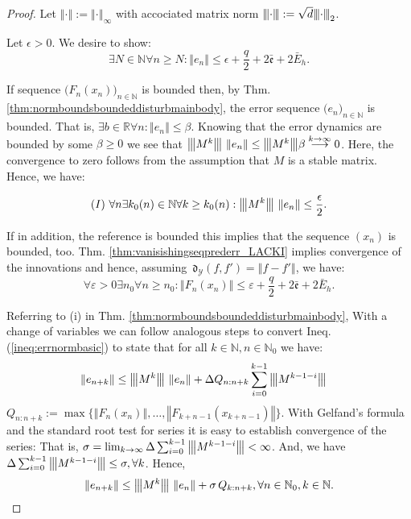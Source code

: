 \documentclass{article} %
\theoremstyle{definition}
\theoremstyle{remark}
\newcommand{\matnorm}[1]{{\left\vert\kern-0.25ex\left\vert\kern-0.25ex\left\vert #1 
    \right\vert\kern-0.25ex\right\vert\kern-0.25ex\right\vert}}
\newcommand{\specnorm}[1]{\matnorm{#1}_2}
\newcommand{\norm}[1]{\left\Vert#1\right\Vert}
\newcommand{\Real}{\mathbb R}
\newcommand{\nat}{\mathbb N}
\newcommand{\vc}[1]{#1}
\newcommand{\outspace}{\ensuremath{ \mathcal Y}}
\newcommand{\metric}{\, \mathfrak{d}} %
\newcommand{\obserrbnd}{\bar{\mathfrak e}}
\newcommand{\seq}[2]{\ensuremath{\bigl(#1\bigr)_{#2}}}
\newcommand{\tinc}{\ensuremath{ \Delta}}
\begin{document}
\begin{proof} Let $\norm{\cdot} := \norm{\cdot}_\infty$ with accociated matrix norm $\matnorm{\cdot} := \sqrt{d} \specnorm{\cdot}$. 


Let $\epsilon >0$. We desire to show: 
\begin{equation}\label{}
\exists N \in \nat \forall n\geq N: \norm{e_n} \leq \epsilon+\frac q 2 + 2  \obserrbnd  +2 \bar E_h.
\end{equation}

If sequence $\seq{F_n(x_n)}{n\in \nat} $ is bounded then, by Thm. \ref{thm:normboundsboundeddisturbmainbody}, the error sequence \seq{e_n}{n\in \nat} is bounded.  That is, $\exists b \in \Real \forall n: \norm{e_n} \leq \beta$.
Knowing that the error dynamics are bounded by some $\beta \geq 0$ we see that $\matnorm{M^{k}} \, \norm{\vc e_n} \leq \matnorm{M^{k}} \beta \stackrel{k \to \infty}{\longrightarrow} 0$. Here, the convergence to zero follows from the assumption that $M$ is a stable matrix. Hence,
we have:

$$(I)  \, \, \forall n \exists k_0(n) \in \nat \forall k \geq k_0(n): \matnorm{M^{k}} \, \norm{\vc e_n} \leq \frac\epsilon 2. $$


If in addition, the reference is bounded this implies that the sequence $(x_n)$ is bounded, too. Thm. \ref{thm:vanisishingseqprederr_LACKI} implies convergence of the innovations and hence, assuming $\metric_\outspace (f,f') = \norm{f-f'}$, we have:
\begin{equation}\label{eq:Fnconv}
\forall \varepsilon >0 \exists n_0 \forall n \geq n_0 : \norm{F_n(x_n)}\leq  \varepsilon +\frac q 2 + 2  \obserrbnd  +2 \bar E_h.
\end{equation} 


Referring to (i) in Thm. \ref{thm:normboundsboundeddisturbmainbody}, With a change of variables we can follow analogous steps to convert Ineq. (\ref{ineq:errnormbasic}) to state that for all $k \in \nat, n \in \nat_0$ we have: 
\begin{align}
	\norm{\vc e_{n+k}} 	&\leq \matnorm{M^{k}} \, \norm{\vc e_n} + \tinc Q_{n:n+k}	 \sum_{i=0}^{k-1}  \matnorm{M^{k-1-i}} 	\label{ineq:errnormgeneral}
\end{align}
$Q_{n:n+k}:=\max\{\norm{F_n(x_n)},\ldots,\norm{F_{k+n-1}(x_{k+n-1})} \}$. 
With Gelfand's formula and the standard root test for series it is easy to establish convergence of the series: That is, $\sigma = \lim_{k \to \infty} \tinc \sum_{i=0}^{k-1}  \matnorm{M^{k-1-i}} < \infty$. And, we have $\tinc \sum_{i=0}^{k-1}  \matnorm{M^{k-1-i}} \leq \sigma, \forall k$.
Hence,
\begin{equation}
\norm{\vc e_{n+k}} \leq \matnorm{M^{k}} \, \norm{\vc e_n} + \sigma \, Q_{k:n+k}, \forall n \in \nat_0, k \in \nat.
\label{eq:errdyn320894}
\end{equation}



\end{proof}
\end{document}

